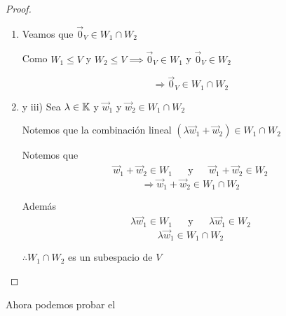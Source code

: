 \begin{proof}
    \begin{enumerate}[label={\roman*})]
    \item Veamos que ${\vec{0}}_{V} \in W_1 \cap W_2$

    Como $W_1 \leq V$ y $W_2 \leq V \implies {\vec{0}}_{V} \in W_1 $ y ${\vec{0}}_{V} \in W_2 $

    $$ \Rightarrow {\vec{0}}_{V} \in W_1 \cap W_2$$

    \item y iii) Sea $\lambda \in \mathbb{K}$ y ${\vec{w}}_{1}$ y ${\vec{w}}_{2} \in  W_1 \cap W_2$

    Notemos que la combinación lineal $(\lambda {\vec{w}}_{1} +{\vec{w}}_{2} ) \in W_1 \cap W_2$

    Notemos que 
    \begin{align*}
    {\vec{w}}_{1} +{\vec{w}}_{2} \in W_1  & & \text{y} & &  {\vec{w}}_{1} +{\vec{w}}_{2} \in W_2 
    \end{align*}
    \begin{equation*}
        \Rightarrow {\vec{w}}_{1} +{\vec{w}}_{2} \in W_1 \cap W_2
    \end{equation*}

    Además
    \begin{align*}
    \lambda {\vec{w}}_{1} \in W_1  & & \text{y} & & \lambda {\vec{w}}_{1} \in W_2 
    \end{align*}
    \begin{equation*}
        \lambda {\vec{w}}_{1} \in W_1 \cap W_2
    \end{equation*}

    $\therefore W_1 \cap W_2$ es un subespacio de $V$
    
    \end{enumerate}
\end{proof}

\begin{remark}
    Ahora podemos probar el  
\end{remark}

